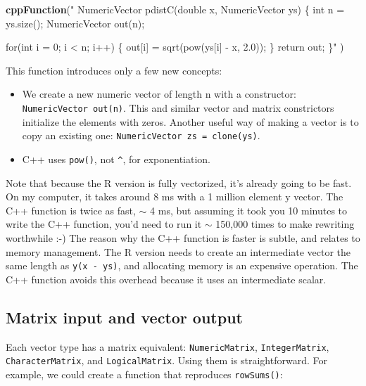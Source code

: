 \documentclass[]{krantz}
\makeatletter
\newenvironment{Shaded}{\begin{snugshade}}{\end{snugshade}}
\newcommand{\KeywordTok}[1]{\textcolor[rgb]{0.27,0.27,0.27}{\textbf{#1}}}
\newcommand{\StringTok}[1]{\textcolor[rgb]{0.5,0.5,0.5}{#1}}
\newcommand{\NormalTok}[1]{#1}
\providecommand{\tightlist}{%
  \setlength{\itemsep}{0pt}\setlength{\parskip}{0pt}}
\newenvironment{kframe}{%
\medskip{}
\setlength{\fboxsep}{.8em}
 \def\at@end@of@kframe{}%
 \ifinner\ifhmode%
  \def\at@end@of@kframe{\end{minipage}}%
  \begin{minipage}{\columnwidth}%
 \fi\fi%
 \def\FrameCommand##1{\hskip\@totalleftmargin \hskip-\fboxsep
 \colorbox{shadecolor}{##1}\hskip-\fboxsep
     \hskip-\linewidth \hskip-\@totalleftmargin \hskip\columnwidth}%
 \MakeFramed {\advance\hsize-\width
   \@totalleftmargin\z@ \linewidth\hsize
   \@setminipage}}%
 {\par\unskip\endMakeFramed%
 \at@end@of@kframe}
\renewenvironment{Shaded}{\begin{kframe}}{\end{kframe}}
\makeatother
\begin{document}
\begin{Shaded}
\begin{Highlighting}[]
\KeywordTok{cppFunction}\NormalTok{(}\StringTok{"}
\StringTok{  NumericVector pdistC(double x, NumericVector ys) \{}
\StringTok{    int n = ys.size();}
\StringTok{    NumericVector out(n);}

\StringTok{    for(int i = 0; i < n; i++) \{}
\StringTok{      out[i] = sqrt(pow(ys[i] - x, 2.0));}
\StringTok{    \}}
\StringTok{    return out;}
\StringTok{  \}"}
\NormalTok{)}
\end{Highlighting}
\end{Shaded}

This function introduces only a few new concepts:

\begin{itemize}
\tightlist
\item
  We create a new numeric vector of length n with a constructor:
  \texttt{NumericVector\ out(n)}. This and similar vector and matrix
  constrictors initialize the elements with zeros. Another useful way of
  making a vector is to copy an existing one:
  \texttt{NumericVector\ zs\ =\ clone(ys)}.
\item
  C++ uses \texttt{pow()}, not \texttt{\^{}}, for exponentiation.
\end{itemize}

Note that because the R version is fully vectorized, it's already going
to be fast. On my computer, it takes around 8 ms with a 1 million
element y vector. The C++ function is twice as fast, \(\sim\) 4 ms, but
assuming it took you 10 minutes to write the C++ function, you'd need to
run it \(\sim\) 150,000 times to make rewriting worthwhile :-) The
reason why the C++ function is faster is subtle, and relates to memory
management. The R version needs to create an intermediate vector the
same length as \texttt{y(x\ -\ ys)}, and allocating memory is an
expensive operation. The C++ function avoids this overhead because it
uses an intermediate scalar.

\subsection{Matrix input and vector
output}\label{matrix-input-and-vector-output}

Each vector type has a matrix equivalent: \texttt{NumericMatrix},
\texttt{IntegerMatrix}, \texttt{CharacterMatrix}, and
\texttt{LogicalMatrix}. Using them is straightforward. For example, we
could create a function that reproduces \texttt{rowSums()}:
\end{document}
